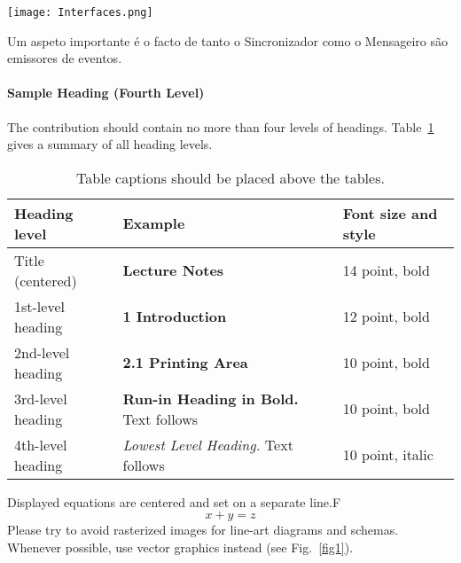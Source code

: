 \documentclass[runningheads]{llncs}
\begin{document}
        \texttt{[image: Interfaces.png]}

        Um aspeto importante é o facto de tanto o Sincronizador como o
        Mensageiro são emissores de eventos.

        \paragraph{Sample Heading (Fourth Level)}
        The contribution should contain no more than four levels of headings.
        Table~\ref{tab1} gives a summary of all heading levels.

        \begin{table}
        \caption{Table captions should be placed above the tables.}\label{tab1}
        \begin{tabular}{|l|l|l|}
        \hline
        Heading level &  Example & Font size and style\\
        \hline
        Title (centered) &  {\Large\bfseries Lecture Notes} & 14 point, bold\\
        1st-level heading &  {\large\bfseries 1 Introduction} & 12 point, bold\\
        2nd-level heading & {\bfseries 2.1 Printing Area} & 10 point, bold\\
        3rd-level heading & {\bfseries Run-in Heading in Bold.} Text follows &
        10 point, bold\\
        4th-level heading & {\itshape Lowest Level Heading.} Text follows & 10
        point, italic\\
        \hline
        \end{tabular}
        \end{table}


        \noindent Displayed equations are centered and set on a separate line.F
        \begin{equation}
        x + y = z
        \end{equation}
        Please try to avoid rasterized images for line-art diagrams and schemas.
        Whenever possible, use vector graphics instead (see Fig.~\ref{fig1}).

\end{document}
